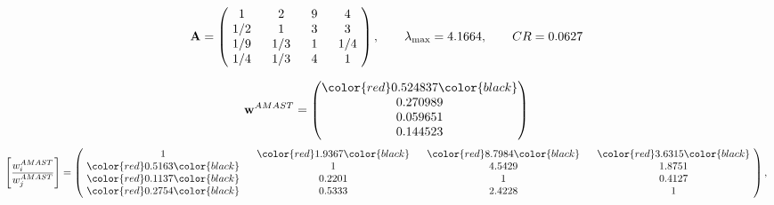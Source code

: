 \begin{example}
\begin{equation*}
\mathbf{A} =
\begin{pmatrix}
$\,\,$ 1 $\,\,$ & $\,\,$2$\,\,$ & $\,\,$9$\,\,$ & $\,\,$4 $\,\,$ \\
$\,\,$ 1/2$\,\,$ & $\,\,$ 1 $\,\,$ & $\,\,$3$\,\,$ & $\,\,$3 $\,\,$ \\
$\,\,$ 1/9$\,\,$ & $\,\,$ 1/3$\,\,$ & $\,\,$ 1 $\,\,$ & $\,\,$ 1/4 $\,\,$ \\
$\,\,$ 1/4$\,\,$ & $\,\,$ 1/3$\,\,$ & $\,\,$4$\,\,$ & $\,\,$ 1  $\,\,$ \\
\end{pmatrix},
\qquad
\lambda_{\max} =
4.1664,
\qquad
CR = 0.0627
\end{equation*}

\begin{equation*}
\mathbf{w}^{AMAST} =
\begin{pmatrix}
\color{red} 0.524837\color{black} \\
0.270989\\
0.059651\\
0.144523
\end{pmatrix}\end{equation*}
\begin{equation*}
\left[ \frac{{w}^{AMAST}_i}{{w}^{AMAST}_j} \right] =
\begin{pmatrix}
$\,\,$ 1 $\,\,$ & $\,\,$\color{red} 1.9367\color{black} $\,\,$ & $\,\,$\color{red} 8.7984\color{black} $\,\,$ & $\,\,$\color{red} 3.6315\color{black} $\,\,$ \\
$\,\,$\color{red} 0.5163\color{black} $\,\,$ & $\,\,$ 1 $\,\,$ & $\,\,$4.5429$\,\,$ & $\,\,$1.8751  $\,\,$ \\
$\,\,$\color{red} 0.1137\color{black} $\,\,$ & $\,\,$0.2201$\,\,$ & $\,\,$ 1 $\,\,$ & $\,\,$0.4127 $\,\,$ \\
$\,\,$\color{red} 0.2754\color{black} $\,\,$ & $\,\,$0.5333$\,\,$ & $\,\,$2.4228$\,\,$ & $\,\,$ 1  $\,\,$ \\
\end{pmatrix},
\end{equation*}


\end{example}
